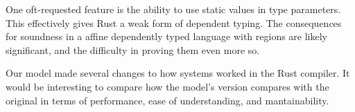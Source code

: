 One oft-requested feature is the ability to use static values in type parameters.
This effectively gives Rust a weak form of dependent typing.
The consequences for soundness in a affine dependently typed language with regions
are likely significant, and the difficulty in proving them even more so.

Our model made several changes to how systems worked in the Rust compiler.
It would be interesting to compare how the model's version compares with the original
in terms of performance, ease of understanding, and mantainability.
